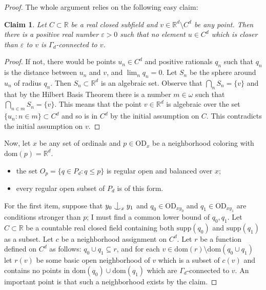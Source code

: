 \documentclass{article}
\newcommand{\gw}{\omega}
\newcommand{\eps}{\varepsilon}
\newcommand{\supp}{\mathrm{supp}}
\newcommand{\dom}{\mathrm{dom}}
\newcommand{\vd}{\mathrm{OD}}
\newcommand{\forkindep}[1][]{%
  \mathrel{
    \mathop{
      \vcenter{
        \hbox{\oalign{\noalign{\kern-.3ex}\hfil$\vert$\hfil\cr
              \noalign{\kern-.7ex}
              $\smile$\cr\noalign{\kern-.3ex}}}
      }
    }\displaylimits_{#1}
  }
}
\newtheorem{claim}[theorem]{Claim}
\theoremstyle{definition}
\begin{document}
\begin{proof}
The whole argument relies on the following easy claim:

\begin{claim}
Let $C\subset\mathbb{R}$ be a real closed subfield and $v\in\mathbb{R}^d\setminus C^d$ be any point. Then there is a positive real number $\eps>0$ such that no element $u\in C^d$ which is closer than $\eps$ to $v$ is $\Gamma_d$-connected to $v$.
\end{claim}

\begin{proof}
If not, there would be points $u_n\in C^d$ and positive rationals $q_n$ such that $q_n$ is the distance between $u_n$ and $v$, and $\lim_nq_n=0$. Let $S_n$ be the sphere around $u_n$ of radius $q_n$. Then $S_n\subset\mathbb{R}^d$ is an algebraic set. Observe that $\bigcap_nS_n=\{v\}$ and that by the Hilbert Basis Theorem there is a number $m\in\gw$ such that $\bigcap_{n\in m}S_n=\{v\}$. This means that the point $v\in\mathbb{R}^d$ is algebraic over the set $\{u_n\colon n\in m\}\subset C^d$ and so is in $C^d$ by the initial assumption on $C$. This contradicts the initial assumption on $v$.
\end{proof}

\noindent Now, let $x$ be any set of ordinals and $p\in\vd_x$ be a neighborhood coloring with $\dom(p)=\mathbb{R}^d$.

\begin{itemize}
\item the set $O_p=\{q\in P_d\colon q\leq p\}$ is regular open and  balanced over $x$;
\item every regular open subset of $P_d$ is of this form.
\end{itemize}


For the first item, suppose that $y_0\forkindep[x]y_1$ and $q_0\in\vd_{xy_0}$ and $q_1\in\vd_{xy_1}$ are conditions stronger than $p$; I must find a common lower bound of $q_0, q_1$. Let $C\subset\mathbb{R}$ be a countable real closed field containing both $\supp(q_0)$ and $\supp(q_1)$ as a subset. Let $c$ be a neighborhood assignment on $C^d$. Let $r$ be a function defined on $C^d$ as follows: $q_0\cup q_1\subseteq r$, and for each $v\in\dom(r)\setminus \dom(q_0\cup q_1)$ let $r(v)$ be some basic open neighborhood of $v$ which is a subset of $c(v)$ and contains no points in $\dom(q_0)\cup\dom(q_1)$ which are $\Gamma_d$-connected to $v$. An important point is that such a neighborhood exists by the claim.


\end{proof}
\end{document}
